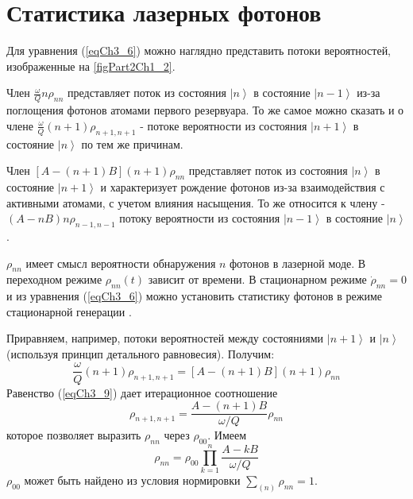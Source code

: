 \section{Статистика лазерных фотонов}
Для уравнения (\ref{eqCh3_6}) можно наглядно представить потоки
вероятностей, изображенные на \autoref{figPart2Ch1_2}. 



Член $\frac{\omega}{Q} n \rho_{nn}$ представляет поток из состояния
$\left|n\right>$ в состояние $\left|n - 1\right>$ из-за 
поглощения фотонов атомами первого резервуара. То же самое можно
сказать и о члене $\frac{\omega}{Q} \left(n + 1\right) \rho_{n + 1, n
  + 1}$ - потоке вероятности из состояния $\left|n + 1\right>$ в состояние
$\left|n\right>$ по тем же причинам. 

Член $\left[A - \left(n + 1\right) B\right]\left(n + 1\right)
\rho_{nn}$ представляет поток из 
состояния $\left|n\right>$ в состояние  
$\left|n + 1\right>$ и характеризует рождение фотонов из-за
взаимодействия с активными атомами, с учетом влияния насыщения. То же
относится к члену   - $\left(A - n B\right)n \rho_{n - 1, n - 1}$
потоку вероятности из состояния $\left|n - 1\right>$ в состояние
$\left|n\right>$.  

$\rho_{nn}$ имеет смысл вероятности обнаружения $n$ фотонов в лазерной
моде. В переходном режиме $\rho_{nn}\left(t\right)$ зависит от
времени. В стационарном режиме $\dot{\rho}_{nn} = 0$
и из уравнения (\ref {eqCh3_6}) можно установить статистику фотонов в режиме
стационарной генерации \cite{bScally1974}. 

Приравняем, например, потоки вероятностей между состояниями 
$\left|n + 1\right>$ и $\left|n\right>$
(используя принцип детального равновесия). Получим: 
\begin{equation}
\frac{\omega}{Q}\left(n + 1\right)\rho_{n + 1, n + 1} =
\left[A - \left(n + 1\right)B\right]\left(n + 1\right)\rho_{nn}
\label{eqCh3_9}
\end{equation}
Равенство (\ref{eqCh3_9}) дает итерационное соотношение
\begin{equation}
\rho_{n + 1, n + 1} = 
\frac{A - \left(n + 1\right)B}{\omega/Q} \rho_{nn}
\label{eqCh3_10}
\end{equation}
которое позволяет выразить $\rho_{nn}$ через $\rho_{00}$.  Имеем
\begin{equation}
\rho_{nn} = \rho_{00}\prod_{k = 1}^n
\frac{A - k B}{\omega/Q} 
\label{eqCh3_11}
\end{equation}
$\rho_{00}$ может быть найдено из условия нормировки
$\sum_{(n)}\rho_{nn} = 1$.

